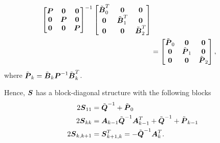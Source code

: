 \begin{align*}
\begin{bmatrix}
    \mbm{P} & \mbm{0}    & \mbm{0}   \\
    \mbm{0}    & \mbm{P} & \mbm{0}   \\
    \mbm{0}    & \mbm{0}    & \mbm{P}\\
  \end{bmatrix}^{-1}
    \begin{bmatrix} 
      \tilde{\mbm{B}}^T_0 & \mbm{0}    & \mbm{0}    \\
      \mbm{0}    & \tilde{\mbm{B}}^T_1 & \mbm{0}    \\
      \mbm{0}    & \mbm{0}    & \tilde{\mbm{B}}^T_2 \\
    \end{bmatrix}\\
&=
  \begin{bmatrix} 
    \tilde{\mbm{P}}_0 & \mbm{0}    & \mbm{0}    \\
    \mbm{0}    & \tilde{\mbm{P}}_1 & \mbm{0}    \\
    \mbm{0}    & \mbm{0}    & \tilde{\mbm{P}}_2 \\
  \end{bmatrix}, 
\end{align*}
where $\tilde{\mbm{P}}_k = \tilde{\mbm{B}}_k\mbm{P}^{-1}\tilde{\mbm{B}}^T_k$.

Hence, $\mbm{S}$ has a block-diagonal structure with the following blocks
\begin{equation*}
\begin{split}
  2\mbm{S}_{11} &= \tilde{\mbm{Q}}^{-1} + \tilde{\mbm{P}}_0  \\
  2\mbm{S}_{kk} &= \mbm{A}_{k-1}\tilde{\mbm{Q}}^{-1}\mbm{A}^T_{k-1} + \tilde{\mbm{Q}}^{-1} + \tilde{\mbm{P}}_{k-1}  \\
  2\mbm{S}_{k,k+1} &= \mbm{S}_{k+1,k}^T = -\tilde{\mbm{Q}}^{-1}\mbm{A}^T_{k}.
\end{split}
\end{equation*}

